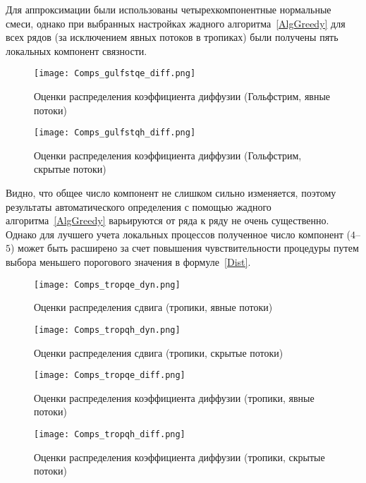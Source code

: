 Для аппроксимации были использованы четырехкомпонентные нормальные смеси, однако при выбранных настройках жадного алгоритма~\ref{AlgGreedy} для всех рядов (за исключением явных потоков в тропиках) были получены пять локальных компонент связности.

\begin{figure}[!h]
	\centering
	\texttt{[image: Comps\_gulfstqe\_diff.png]}
	\caption{Оценки распределения коэффициента диффузии (Гольфстрим, явные потоки)}
	\label{fig:Comps_gulfstqe_diff}
\end{figure}

\begin{figure}[!h]
	\centering
	\texttt{[image: Comps\_gulfstqh\_diff.png]}
	\caption{Оценки распределения коэффициента диффузии (Гольфстрим, скрытые потоки)}
	\label{fig:Comps_gulfstqh_diff}
\end{figure}

Видно, что общее число компонент не слишком сильно изменяется, поэтому результаты автоматического определения с помощью жадного алгоритма~\ref{AlgGreedy} варьируются от ряда к ряду не очень существенно. Однако для лучшего учета локальных процессов полученное число компонент ($4$--$5$) может быть расширено за счет повышения чувствительности процедуры путем выбора меньшего порогового значения в формуле~\eqref{Dist}.

\begin{figure}[!h]
	\centering
	\texttt{[image: Comps\_tropqe\_dyn.png]}
	\caption{Оценки распределения сдвига (тропики, явные потоки)}
	\label{fig:Comps_tropqe_dyn}
\end{figure}

\begin{figure}[!h]
	\centering
	\texttt{[image: Comps\_tropqh\_dyn.png]}
	\caption{Оценки распределения сдвига (тропики, скрытые потоки)}
	\label{fig:Comps_tropqh_dyn}
\end{figure}

\begin{figure}[!h]
	\centering
	\texttt{[image: Comps\_tropqe\_diff.png]}
	\caption{Оценки распределения коэффициента диффузии (тропики, явные потоки)}
	\label{fig:Comps_troptqe_diff}
\end{figure}

\begin{figure}[!h]
	\centering
	\texttt{[image: Comps\_tropqh\_diff.png]}
	\caption{Оценки распределения коэффициента диффузии (тропики, скрытые потоки)}
	\label{fig:Comps_troptqh_diff}
\end{figure}

